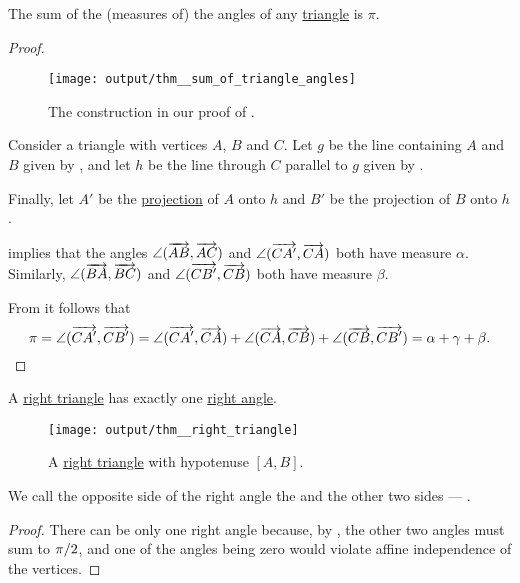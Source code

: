 \begin{proposition}\label{thm:sum_of_triangle_angles}
  The sum of the (measures of) the angles of any \hyperref[def:triangle]{triangle} is \( \pi \).
\end{proposition}
\begin{proof}
  \begin{figure}[!ht]
    \centering
    \texttt{[image: output/thm\_\_sum\_of\_triangle\_angles]}
    \caption{The construction in our proof of .}\label{fig:thm:sum_of_triangle_angles}
  \end{figure}

  Consider a triangle with vertices \( A \), \( B \) and \( C \). Let \( g \) be the line containing \( A \) and \( B \) given by , and let \( h \) be the line through \( C \) parallel to \( g \) given by .

  Finally, let \( A' \) be the \hyperref[def:orthogonal_projection]{projection} of \( A \) onto \( h \) and \( B' \) be the projection of \( B \) onto \( h \).

   implies that the angles \( \angle(\overrightarrow{AB}, \overrightarrow{AC}) \) and \( \angle(\overrightarrow{CA'}, \overrightarrow{CA}) \) both have measure \( \alpha \). Similarly, \( \angle(\overrightarrow{BA}, \overrightarrow{BC}) \) and \( \angle(\overrightarrow{CB'}, \overrightarrow{CB}) \) both have measure \( \beta \).

  From  it follows that
  \begin{equation*}
    \pi
    =
    \angle(\overrightarrow{CA'}, \overrightarrow{CB'})
    =
    \angle(\overrightarrow{CA'}, \overrightarrow{CA}) + \angle(\overrightarrow{CA}, \overrightarrow{CB}) + \angle(\overrightarrow{CB}, \overrightarrow{CB'})
    =
    \alpha + \gamma + \beta.
  \end{equation*}
\end{proof}

\begin{corollary}\label{thm:right_triangle}
  A \hyperref[def:triangle/right]{right triangle} has exactly one \hyperref[def:angle/measure/right]{right angle}.

  \begin{figure}[!ht]
    \centering
    \texttt{[image: output/thm\_\_right\_triangle]}
    \caption{A \hyperref[def:triangle/right]{right triangle} with hypotenuse \( [A, B] \).}\label{fig:thm:right_triangle}
  \end{figure}

  We call the opposite side of the right angle the  and the other two sides --- .
\end{corollary}
\begin{proof}
  There can be only one right angle because, by , the other two angles must sum to \( \ifrac \pi 2 \), and one of the angles being zero would violate affine independence of the vertices.
\end{proof}

